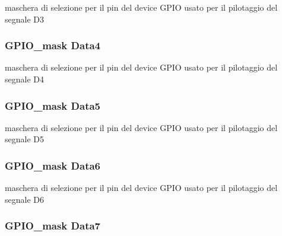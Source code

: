 maschera di selezione per il pin del device G\+P\+I\+O usato per il pilotaggio del segnale D3 \hypertarget{struct_h_d44780___l_c_d__t_a923c685eba8920c56f33117410da2742}{
\subsubsection[{Data4}]{\setlength{\rightskip}{0pt plus 5cm}G\+P\+I\+O\+\_\+mask Data4}}\label{struct_h_d44780___l_c_d__t_a923c685eba8920c56f33117410da2742}
maschera di selezione per il pin del device G\+P\+I\+O usato per il pilotaggio del segnale D4 \hypertarget{struct_h_d44780___l_c_d__t_aff5ae7b6e5cd6f96a13e719cd07e3f15}{
\subsubsection[{Data5}]{\setlength{\rightskip}{0pt plus 5cm}G\+P\+I\+O\+\_\+mask Data5}}\label{struct_h_d44780___l_c_d__t_aff5ae7b6e5cd6f96a13e719cd07e3f15}
maschera di selezione per il pin del device G\+P\+I\+O usato per il pilotaggio del segnale D5 \hypertarget{struct_h_d44780___l_c_d__t_a6a787746d32e0e18dbd57202e547756b}{
\subsubsection[{Data6}]{\setlength{\rightskip}{0pt plus 5cm}G\+P\+I\+O\+\_\+mask Data6}}\label{struct_h_d44780___l_c_d__t_a6a787746d32e0e18dbd57202e547756b}
maschera di selezione per il pin del device G\+P\+I\+O usato per il pilotaggio del segnale D6 \hypertarget{struct_h_d44780___l_c_d__t_a7f1bd9ea66e1fa6d0667c3f60d2f155d}{
\subsubsection[{Data7}]{\setlength{\rightskip}{0pt plus 5cm}G\+P\+I\+O\+\_\+mask Data7}}\label{struct_h_d44780___l_c_d__t_a7f1bd9ea66e1fa6d0667c3f60d2f155d}

